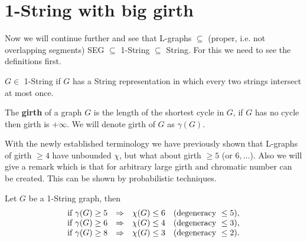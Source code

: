 \section{1-String with big girth}

Now we will continue further and see that L-graphs $\subseteq$ (proper, i.e. not overlapping segments) SEG $\subseteq$ 1-String $\subseteq$ String. For this we need to see the definitions first.

\begin{defn}
	$G \in$ 1-String if $G$ has a String representation in which every two strings intersect at most once.
\end{defn}

\begin{defn}
	The \textbf{girth} of a graph $G$ is the length of the shortest cycle in $G$, if $G$ has no cycle then girth is $+ \infty$. We will denote girth of $G$ as $\gamma(G)$.
\end{defn}

With the newly established terminology we have previously shown that L-graphs of girth $\geq 4$ have unbounded $\chi$, but what about girth $\geq 5$ (or $6, \dots$). Also we will give a remark which is that for arbitrary large girth and chromatic number can be created. This can be shown by probabilistic techniques.

\begin{thm}
	Let $G$ be a 1-String graph, then
	$$
	\begin{array}{r c l r}
		\text{if } \gamma(G) \geq 5 & \Rightarrow & \chi(G) \leq 6 & (\text{degeneracy } \leq 5), \\
		\text{if } \gamma(G) \geq 6 & \Rightarrow & \chi(G) \leq 4 & (\text{degeneracy } \leq 3), \\
		\text{if } \gamma(G) \geq 8 & \Rightarrow & \chi(G) \leq 3 & (\text{degeneracy } \leq 2). \\
	\end{array}
	$$
\end{thm}

